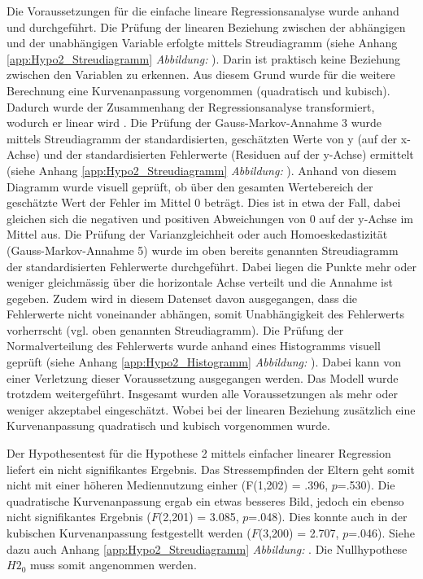 Die Voraussetzungen für die einfache lineare Regressionsanalyse wurde anhand  und  durchgeführt. Die Prüfung der linearen Beziehung zwischen der abhängigen und der unabhängigen Variable erfolgte mittels Streudiagramm (siehe Anhang \ref{app:Hypo2_Streudiagramm}  \textit{Abbildung: } ). Darin ist praktisch keine Beziehung zwischen den Variablen zu erkennen. Aus diesem Grund wurde für die weitere Berechnung eine Kurvenanpassung vorgenommen (quadratisch und kubisch). Dadurch wurde der Zusammenhang der Regressionsanalyse transformiert, wodurch er linear wird \cite{UniversitatZurich2018}. Die Prüfung der Gauss-Markov-Annahme 3 \cite{UniversitatZurich2018} wurde mittels Streudiagramm der standardisierten, geschätzten Werte von y (auf der x-Achse) und der standardisierten Fehlerwerte (Residuen auf der y-Achse) ermittelt (siehe Anhang \ref{app:Hypo2_Streudiagramm} \textit{Abbildung: }). Anhand von diesem Diagramm wurde visuell geprüft, ob über den gesamten Wertebereich der geschätzte Wert der Fehler im Mittel 0 beträgt. Dies ist in etwa der Fall, dabei gleichen sich die negativen und positiven Abweichungen von 0 auf der y-Achse im Mittel aus. Die Prüfung der Varianzgleichheit oder auch Homoeskedastizität (Gauss-Markov-Annahme 5) wurde im oben bereits genannten Streudiagramm der standardisierten Fehlerwerte durchgeführt. Dabei liegen die Punkte mehr oder weniger gleichmässig über die horizontale Achse verteilt und die Annahme ist gegeben. Zudem wird in diesem Datenset davon ausgegangen, dass die Fehlerwerte nicht voneinander abhängen, somit Unabhängigkeit des Fehlerwerts vorherrscht (vgl. oben genannten Streudiagramm). Die Prüfung der Normalverteilung des Fehlerwerts wurde anhand eines Histogramms visuell geprüft (siehe Anhang \ref{app:Hypo2_Histogramm} \textit{Abbildung: }). Dabei kann von einer Verletzung dieser Voraussetzung ausgegangen werden. Das Modell wurde trotzdem weitergeführt. Insgesamt wurden alle Voraussetzungen als mehr oder weniger akzeptabel eingeschätzt. Wobei bei der linearen Beziehung zusätzlich eine Kurvenanpassung quadratisch und kubisch vorgenommen wurde.

Der Hypothesentest für die Hypothese 2 mittels einfacher linearer Regression liefert ein nicht signifikantes Ergebnis. Das Stressempfinden der Eltern geht somit nicht mit einer höheren Mediennutzung einher (F(1,202) = .396, $p$=.530). Die quadratische Kurvenanpassung ergab ein etwas besseres Bild, jedoch ein ebenso nicht signifikantes Ergebnis ($F$(2,201) = 3.085, $p$=.048). Dies konnte auch in der kubischen Kurvenanpassung festgestellt werden ($F$(3,200) = 2.707, $p$=.046). Siehe dazu auch Anhang \ref{app:Hypo2_Streudiagramm} \textit{Abbildung: }. Die Nullhypothese $H2_{0}$ muss somit angenommen werden.

